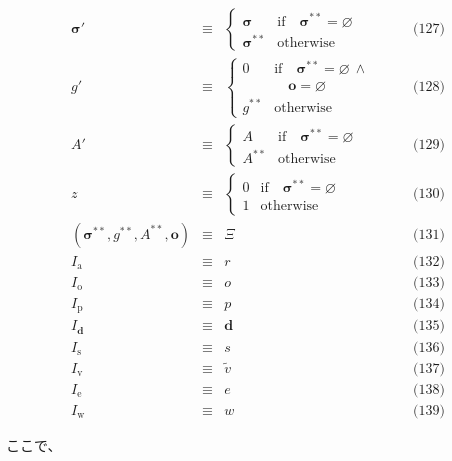 \documentclass[
]{ltjsarticle}
\begin{document}
\[\begin{aligned}
\boldsymbol{\sigma}' & \equiv & \begin{cases}
\boldsymbol{\sigma} & \text{if} \quad \boldsymbol{\sigma}^{**} = \varnothing \\
\boldsymbol{\sigma}^{**} & \text{otherwise}
\end{cases} & \qquad \text{(127)} \\
g' & \equiv & \begin{cases}
0 & \text{if} \quad \boldsymbol{\sigma}^{**} = \varnothing \ \wedge \\
&\quad \mathbf{o} = \varnothing \\
g^{**} & \text{otherwise}
\end{cases} & \qquad \text{(128)} \\
A' & \equiv & \begin{cases}
A & \text{if} \quad \boldsymbol{\sigma}^{**} = \varnothing \\
A^{**} & \text{otherwise}
\end{cases} & \qquad \text{(129)} \\
z & \equiv & \begin{cases}
0 & \text{if} \quad \boldsymbol{\sigma}^{**} = \varnothing \\
1 & \text{otherwise}
\end{cases} & \qquad \text{(130)} \\
(\boldsymbol{\sigma}^{**}, g^{**}, A^{**}, \mathbf{o}) & \equiv & \Xi & \qquad \text{(131)} \\
I_{\mathrm{a}} & \equiv & r & \qquad \text{(132)} \\
I_{\mathrm{o}} & \equiv & o & \qquad \text{(133)} \\
I_{\mathrm{p}} & \equiv & p & \qquad \text{(134)} \\
I_{\mathbf{d}} & \equiv & \mathbf{d} & \qquad \text{(135)} \\
I_{\mathrm{s}} & \equiv & s & \qquad \text{(136)} \\
I_{\mathrm{v}} & \equiv & \tilde{v} & \qquad \text{(137)} \\
I_{\mathrm{e}} & \equiv & e & \qquad \text{(138)} \\
I_{\mathrm{w}} & \equiv & w & \qquad \text{(139)}
\end{aligned}\]

ここで、

\protect\hypertarget{eq-140}{}{}
\end{document}
